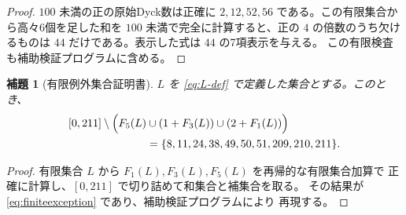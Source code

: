 \documentclass[12pt]{ltjsarticle}
\theoremstyle{plain}
\newtheorem{lemma}[theorem]{補題}
\theoremstyle{definition}
\theoremstyle{plain}
\begin{document}
\begin{proof}
$100$ 未満の正の原始Dyck数は正確に
$2,12,52,56$ である。この有限集合から高々6個を足した和を
$100$ 未満で完全に計算すると、正の $4$ の倍数のうち欠けるものは
$44$ だけである。表示した式は $44$ の7項表示を与える。
この有限検査も補助検証プログラムに含める。
\end{proof}

\begin{lemma}[有限例外集合証明書]\label{lem:finiteexception}
$L$ を \eqref{eq:L-def} で定義した集合とする。このとき、
\begin{equation}\label{eq:finiteexception}
\begin{split}
 [0,211]\setminus\Bigl(
 F_5(L)&\cup(1+F_3(L))\cup(2+F_1(L))\Bigr)\\
 &=\{8,11,24,38,49,50,51,209,210,211\}.
\end{split}
\end{equation}
\end{lemma}

\begin{proof}
有限集合 $L$ から $F_1(L),F_3(L),F_5(L)$ を再帰的な有限集合加算で
正確に計算し、$[0,211]$ で切り詰めて和集合と補集合を取る。
その結果が \eqref{eq:finiteexception} であり、補助検証プログラムにより
再現する。
\end{proof}
\end{document}
